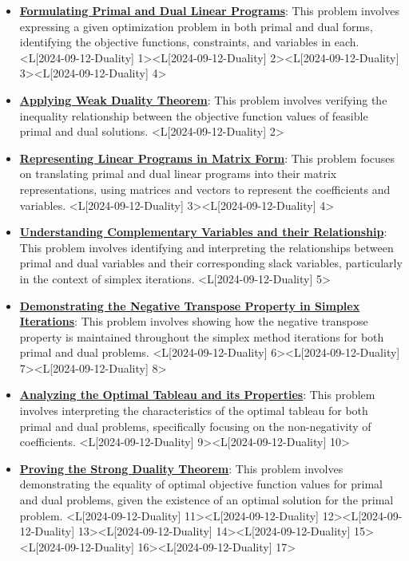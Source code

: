 \documentclass{article}%
\begin{document}
\begin{itemize}[[leftmargin=*]]%
\item \href{https://www.math.purdue.edu/~yipn/421/2024-09-12-Duality.pdf#page=1}{\textbf{Formulating Primal and Dual Linear Programs}}: This problem involves expressing a given optimization problem in both primal and dual forms, identifying the objective functions, constraints, and variables in each. <L[2024-09-12-Duality] 1><L[2024-09-12-Duality] 2><L[2024-09-12-Duality] 3><L[2024-09-12-Duality] 4>%
\item \href{https://www.math.purdue.edu/~yipn/421/2024-09-12-Duality.pdf#page=2}{\textbf{Applying Weak Duality Theorem}}: This problem involves verifying the inequality relationship between the objective function values of feasible primal and dual solutions. <L[2024-09-12-Duality] 2>%
\item \href{https://www.math.purdue.edu/~yipn/421/2024-09-12-Duality.pdf#page=3}{\textbf{Representing Linear Programs in Matrix Form}}: This problem focuses on translating primal and dual linear programs into their matrix representations, using matrices and vectors to represent the coefficients and variables. <L[2024-09-12-Duality] 3><L[2024-09-12-Duality] 4>%
\item \href{https://www.math.purdue.edu/~yipn/421/2024-09-12-Duality.pdf#page=5}{\textbf{Understanding Complementary Variables and their Relationship}}: This problem involves identifying and interpreting the relationships between primal and dual variables and their corresponding slack variables, particularly in the context of simplex iterations. <L[2024-09-12-Duality] 5>%
\item \href{https://www.math.purdue.edu/~yipn/421/2024-09-12-Duality.pdf#page=6}{\textbf{Demonstrating the Negative Transpose Property in Simplex Iterations}}: This problem involves showing how the negative transpose property is maintained throughout the simplex method iterations for both primal and dual problems. <L[2024-09-12-Duality] 6><L[2024-09-12-Duality] 7><L[2024-09-12-Duality] 8>%
\item \href{https://www.math.purdue.edu/~yipn/421/2024-09-12-Duality.pdf#page=9}{\textbf{Analyzing the Optimal Tableau and its Properties}}: This problem involves interpreting the characteristics of the optimal tableau for both primal and dual problems, specifically focusing on the non-negativity of coefficients. <L[2024-09-12-Duality] 9><L[2024-09-12-Duality] 10>%
\item \href{https://www.math.purdue.edu/~yipn/421/2024-09-12-Duality.pdf#page=11}{\textbf{Proving the Strong Duality Theorem}}: This problem involves demonstrating the equality of optimal objective function values for primal and dual problems, given the existence of an optimal solution for the primal problem. <L[2024-09-12-Duality] 11><L[2024-09-12-Duality] 12><L[2024-09-12-Duality] 13><L[2024-09-12-Duality] 14><L[2024-09-12-Duality] 15><L[2024-09-12-Duality] 16><L[2024-09-12-Duality] 17>%

\end{itemize}
\end{document}
